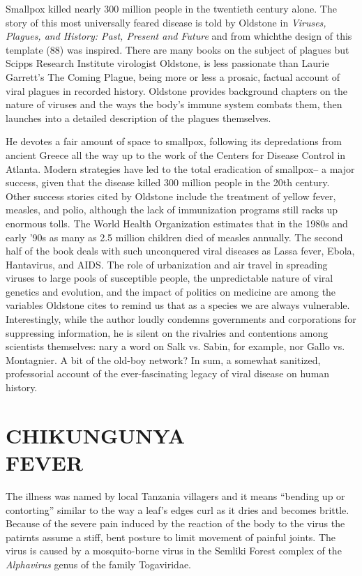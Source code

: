 Smallpox killed nearly 300 million people in the twentieth century alone. The story of this most universally feared disease is told by Oldstone in \emph{Viruses, Plagues, and History: Past, Present and Future} and from whichthe design of this template (88) was inspired. There are many books on the subject of plagues but Scipps 
Research Institute virologist Oldstone, is less passionate than Laurie Garrett's The Coming Plague, being more or less a prosaic, factual account of viral plagues in recorded history. Oldstone provides background chapters on the nature of viruses and the ways the body's immune system combats them, then launches into a detailed description of the plagues themselves.

He devotes a fair amount of space to smallpox, following its depredations from ancient Greece all the way up to the work of the Centers for Disease Control in Atlanta. Modern strategies have led to the total eradication of smallpox-- a major success, given that the disease killed 300 million people in the 20th century. Other success stories cited by Oldstone include the treatment of yellow fever, measles, and polio, although the lack of immunization programs still racks up enormous tolls. The World Health Organization estimates that in the 1980s and early '90s as many as 2.5 million children died of measles annually. The second half of the book deals with such unconquered viral diseases as Lassa fever, Ebola, Hantavirus, and AIDS. The role of urbanization and air travel in spreading viruses to large pools of susceptible people, the unpredictable nature of viral genetics and evolution, and the impact of politics on medicine are among the variables Oldstone cites to remind us that as a species we are always vulnerable. Interestingly, while the author loudly condemns governments and corporations for suppressing information, he is silent on the rivalries and contentions among scientists themselves: nary a word on Salk vs. Sabin, for example, nor Gallo vs. Montagnier. A bit of the old-boy network? In sum, a somewhat sanitized, professorial account of the ever-fascinating legacy of viral disease on human history.

\chapter[Chikungunya Fever]{CHIKUNGUNYA\\FEVER}

The illness was named by local Tanzania villagers and it means “bending up or contorting” similar to the way a leaf’s edges curl as it dries and becomes brittle. Because of the severe pain induced by the reaction of the body to the virus the patirnts assume a stiff, bent posture to limit movement of painful joints. The virus is caused by a mosquito-borne virus in the Semliki Forest complex of the \emph{Alphavirus} genus of the family Togaviridae. 

